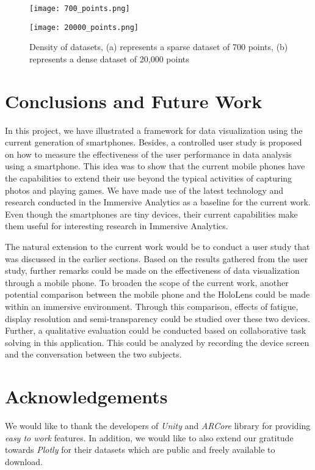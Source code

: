 \documentclass[journal]{vgtc}                %
\begin{document}
\begin{figure}[ht]
    \begin{minipage}[b]{0.45\linewidth}
        \centering
        \texttt{[image: 700\_points.png]}
        \subcaption{}
    \end{minipage}
    \hspace{0.5cm}
    \begin{minipage}[b]{0.45\linewidth}
        \centering
        \texttt{[image: 20000\_points.png]}
      \subcaption{}
    \end{minipage}
    \caption{Density of datasets, (a) represents a sparse dataset of 700 points, (b) represents a dense dataset of 20,000 points}
\end{figure}

\section{Conclusions and Future Work}
In this project, we have illustrated a framework for data visualization using the current generation of smartphones. Besides, a controlled user study is proposed on how to measure the effectiveness of the user performance in data analysis using a smartphone. This idea was to show that the current mobile phones have the capabilities to extend their use beyond the typical activities of capturing photos and playing games. We have made use of the latest technology and research conducted in the Immersive Analytics as a baseline for the current work. Even though the smartphones are tiny devices, their current capabilities make them useful for interesting research in Immersive Analytics.

The natural extension to the current work would be to conduct a user study that was discussed in the earlier sections. Based on the results gathered from the user study, further remarks could be made on the effectiveness of data visualization through a mobile phone. To broaden the scope of the current work, another potential comparison between the mobile phone and the HoloLens could be made within an immersive environment. Through this comparison, effects of fatigue, display resolution and semi-transparency could be studied over these two devices. Further, a qualitative evaluation\cite{Preim} could be conducted based on collaborative task solving in this application. This could be analyzed by recording the device screen and the conversation between the two subjects.

\section{Acknowledgements}
We would like to thank the developers of \textit{Unity} and \textit{ARCore} library for providing \textit{easy to work} features. In addition, we would like to also extend our gratitude towards \textit{Plotly} for their datasets which are public and freely available to download. 
\end{document}
